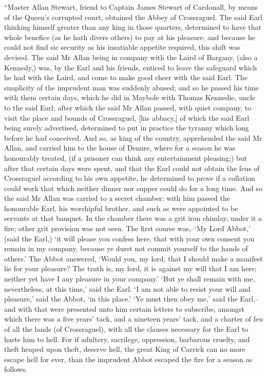 ``Master Allan Stewart, friend to Captain James Stewart of Cardonall, by
means of the Queen's corrupted court, obtained the Abbey of Crossraguel.
The said Earl thinking himself greater than any king in those quarters,
determined to have that whole benefice (as he hath divers others) to pay
at his pleasure; and because he could not find sic security as his
insatiable appetite required, this shift was devised. The said Mr Allan
being in company with the Laird of Bargany, (also a Kennedy,) was, by
the Earl and his friends, enticed to leave the safeguard which he had
with the Laird, and come to make good cheer with the said Earl. The
simplicity of the imprudent man was suddenly abused; and so he passed
his time with them certain days, which he did in Maybole with Thomas
Kennedie, uncle to the said Earl; after which the said Mr Allan passed,
with quiet company, to visit the place and bounds of Crossraguel, {[}his
abbacy,{]} of which the said Earl being surely advertised, determined to
put in practice the tyranny which long before he had conceived. And so,
as king of the country, apprehended the said Mr Allan, and carried him
to the house of Denure, where for a season he was honourably treated,
(if a prisoner can think any entertainment pleasing;) but after that
certain days were spent, and that the Earl could not obtain the feus of
Crossraguel according to his own appetite, he determined to prove if a
collation could work that which neither dinner nor supper could do for a
long time. And so the said Mr Allan was carried to a secret chamber:
with him passed the honourable Earl, his worshipful brother, and such as
were appointed to be servants at that banquet. In the chamber there was
a grit iron chimlay, under it a fire; other grit provision was not seen.
The first course was,--`My Lord Abbot,' (said the Earl,) `it will please
you confess here, that with your own consent you remain in my company,
because ye durst not commit yourself to the hands of others.' The Abbot
answered, `Would you, my lord, that I should make a manifest lie for
your pleasure? The truth is, my lord, it is against my will that I am
here; neither yet have I any pleasure in your company.' `But ye shall
remain with me, nevertheless, at this time,' said the Earl. `I am not
able to resist your will and pleasure,' said the Abbot, `in this place.'
`Ye must then obey me,' said the Earl,--and with that were presented
unto him certain letters to subscribe, amongst which there was a five
years' tack, and a nineteen years' tack, and a charter of feu of all the
lands (of Crossraguel), with all the clauses necessary for the Earl to
haste him to hell. For if adultery, sacrilege, oppression, barbarous
cruelty, and theft heaped upon theft, deserve hell, the great King of
Carrick can no more escape hell for ever, than the imprudent Abbot
escaped the fire for a season as follows.

